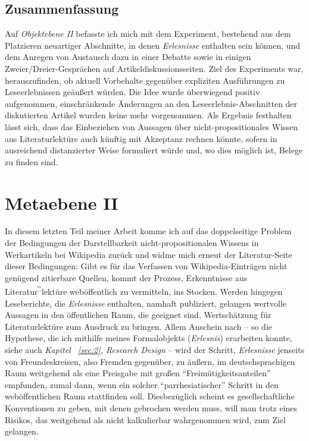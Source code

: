 \documentclass[fontsize=12pt]{scrartcl}
\begin{document}
\subsection{Zusammenfassung}
\label{subsec:6.3}

Auf \textit{Objektebene II} befasste ich mich mit dem Experiment, bestehend aus dem Platzieren neuartiger Abschnitte, in denen \textit{Erlesnisse} enthalten sein k\"onnen, und dem Anregen von Austausch dazu in einer Debatte sowie in einigen Zweier/Dreier-Gespr\"achen auf Artikeldis\-kus\-si\-onssei\-ten. Ziel des Experiments war, he\-raus\-zu\-fin\-den, ob aktuell Vorbehalte gegen\"uber expliziten Ausf\"uh\-rungen zu Leseerlebnissen ge\"au{\ss}ert w\"urden. Die Idee wurde \"uberwiegend positiv aufgenommen, einschr\"ankende \"Ande\-rungen an den Leseerlebnis-Abschnitten der diskutierten Artikel wurden keine mehr vorgenommen. Als Ergebnis festhalten l\"asst sich, dass das Einbeziehen von Aussagen \"uber nicht-pro\-po\-si\-ti\-o\-na\-les Wissen aus Li\-te\-ra\-tur\-lekt\"ure auch k\"unftig mit Akzeptanz rechnen k\"onnte, sofern in ausreichend distanzierter Weise formuliert w\"urde und, wo dies m\"oglich ist, Belege zu finden sind.

\pagebreak

\section{Metaebene II}
\label{sec:7}

In diesem letzten Teil meiner Arbeit komme ich auf das doppelseitige Pro\-blem der Bedingungen der Darstellbarkeit nicht-pro\-po\-si\-ti\-o\-na\-len Wissens in Werkartikeln bei Wi\-ki\-pe\-dia zur\"uck und widme mich erneut der Literatur-Seite dieser Bedingungen: Gibt es f\"ur das Verfassen von Wikipedia-Eintr\"agen nicht gen\"ugend zitierbare Quellen, kommt der Prozess, Erkenntnisse aus Li\-te\-ra\-tur\textsuperscript{\~.\~.}lekt\"ure web\"offentlich zu vermitteln, ins Stocken. Werden hingegen Leseberichte, die \textit{Erlesnisse} enthalten, namhaft pu\-bli\-ziert, gelangen wertvolle Aussagen in den \"of\-fent\-lichen Raum, die geeignet sind, Wertsch\"atzung f\"ur Literaturlekt\"ure zum Ausdruck zu bringen. Allem Anschein nach -- so die Hypothese, die ich mithilfe meines Formalobjekts (\textit{Erlesnis}) erarbeiten konnte, siehe auch \textit{Kapitel ~\ref{sec:2}, Research Design} -- wird der Schritt, \textit{Erlesnisse} jenseits von Freund\textsuperscript{\tiny *}eskreisen, also Fremden gegen\"uber, zu \"au{\ss}ern, im deutschsprachigen Raum weitgehend als eine Preisgabe mit gro{\ss}en "`Frei\-m\"u\-tig\-keits\-an\-tei\-len"' empfunden, zumal dann, wenn ein solcher "`parrhesiatischer"' Schritt in den web\"offentlichen Raum stattfinden soll. Diesbez\"uglich scheint es gesellschaftliche Konventionen zu geben, mit denen gebrochen werden muss, will man trotz eines Risikos, das weitgehend als nicht kalkulierbar wahrgenommen wird, zum Ziel gelangen.
\end{document}
